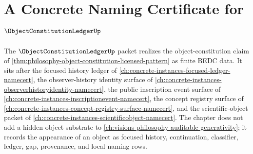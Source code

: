 \chapter{A Concrete Naming Certificate for $\ObjectConstitutionLedgerUp$}
\label{ch:concrete-instances-objectconstitutionledger-namecert}

The $\ObjectConstitutionLedgerUp$ packet realizes the object-constitution claim of \autoref{thm:philosophy-object-constitution-licensed-pattern} as finite BEDC data. It sits after the focused history ledger of \autoref{ch:concrete-instances-focused-ledger-namecert}, the observer-history identity surface of \autoref{ch:concrete-instances-observerhistoryidentity-namecert}, the public inscription event surface of \autoref{ch:concrete-instances-inscriptionevent-namecert}, the concept registry surface of \autoref{ch:concrete-instances-concept-registry-surface-namecert}, and the scientific-object packet of \autoref{ch:concrete-instances-scientificobject-namecert}. The chapter does not add a hidden object substrate to \autoref{ch:visions-philosophy-auditable-generativity}; it records the appearance of an object as focused history, continuation, classifier, ledger, gap, provenance, and local naming rows.

